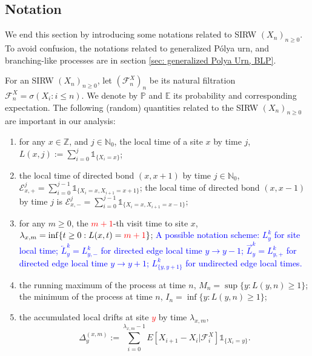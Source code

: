 \documentclass[twoside,12pt,a4paper]{article}
\numberwithin{equation}{section}
\newcommand{\edt}[1]{\textcolor{red}{#1}} %
\newcommand{\comment}[1]{\textcolor{blue}{#1}}
\begin{document}
	\subsection{Notation}
	We end this section by introducing some notations related to SIRW $(X_n)_{n\geq 0}$. To avoid confusion, the notations related to generalized P\'{o}lya urn, and branching-like processes are in section \ref{sec: generalized Polya Urn, BLP}.
	
	For an SIRW $(X_n)_{n\geq 0}$,  let $(\mathcal{F}^X_n)_n$ be its natural filtration $\mathcal{F}^X_n = \sigma\left(X_i: i\leq n \right).$ We denote by $\mathbb{P}$ and $\mathbb{E}$ its probability and corresponding expectation. The following (random) quantities related to the SIRW $(X_n)_{n\geq0}$ are important in our analysis:
	\begin{enumerate}
		\item for any $x \in \mathbb{Z}$, and $j\in \mathbb{N}_0$, the local time of a site $x$ by time $j$, $L(x,j):= \sum_{i=0}^j \mathbb{1}_{\{X_i=x\} }$; %
		
		\item the local time of directed bond $(x,x+1)$ by time $j\in \mathbb{N}_0$,
		$ \mathcal{E}^j_{x,+} = \sum_{i=0}^{j-1} \mathbb{1}_{\{X_i=x, X_{i+1} =x+1 \} } $; the local time of directed bond $(x,x-1)$ by time $j$ is $ \mathcal{E}^j_{x,-} = \sum_{i=0}^{j-1} \mathbb{1}_{\{X_i=x, X_{i+1} =x-1 \} }; $
		
		
		\item for any $m\geq 0$, the \edt{$m+1$}-th visit time to site $x$, $\lambda_{x,m} = \inf\{t \geq 0: L(x,t) = \edt{m+1} \}$;
			\comment{A possible notation scheme: $L_y^k$ for site local time; $\overleftarrow{L}_y^k = L_{y, -}^k$ for directed edge local time $y \to y-1$; $\overrightarrow{L}_y^k = L_{y, +}^k$ for directed edge local time  $y \to y+1$; $L_{\{y, y+1\}}^k $ for undirected edge local times.}
		
		\item the running maximum of the process at time $n$, $M_n= \sup\{y: L(y,n)\geq 1 \} $; the minimum of the process at time $n$, $I_n= \inf\{y: L(y,n)\geq 1 \} $;
		
		\item 
		the accumulated local drifts at site \edt{$y$} by time $\lambda_{x,m}$, 
		\begin{equation}\label{eq: accumulated local drift}
			\Delta_y^{(x,m)}:= \sum_{i=0}^{\lambda_{x,m}-1} E[X_{i+1}-X_i\vert \mathcal{F}_{i}^X] \mathbb{1}_{\{X_i=y\}}.
		\end{equation}
	\end{enumerate}
	
\end{document}
